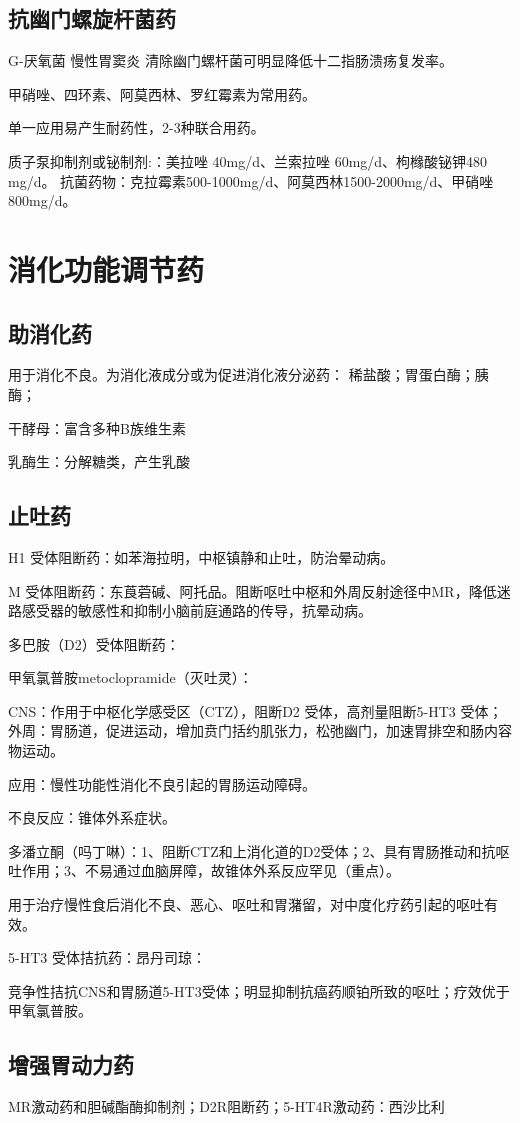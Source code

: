 \documentclass[UTF8]{ctexbook}
\begin{document}
\subsection{抗幽门螺旋杆菌药}
G-厌氧菌   慢性胃窦炎
清除幽门螺杆菌可明显降低十二指肠溃疡复发率。

甲硝唑、四环素、阿莫西林、罗红霉素为常用药。

单一应用易产生耐药性，2-3种联合用药。

质子泵抑制剂或铋制剂:：美拉唑 40mg/d、兰索拉唑 60mg/d、枸橼酸铋钾480 mg/d。
抗菌药物：克拉霉素500-1000mg/d、阿莫西林1500-2000mg/d、甲硝唑 800mg/d。

\section{消化功能调节药}
\subsection{助消化药}
用于消化不良。为消化液成分或为促进消化液分泌药：
稀盐酸；胃蛋白酶；胰酶；

干酵母：富含多种B族维生素

乳酶生：分解糖类，产生乳酸
\subsection{止吐药}
H1 受体阻断药：如苯海拉明，中枢镇静和止吐，防治晕动病。

M 受体阻断药：东莨菪碱、阿托品。阻断呕吐中枢和外周反射途径中MR，降低迷路感受器的敏感性和抑制小脑前庭通路的传导，抗晕动病。

多巴胺（D2）受体阻断药：

甲氧氯普胺metoclopramide（灭吐灵）：

CNS：作用于中枢化学感受区（CTZ），阻断D2 受体，高剂量阻断5-HT3 受体；外周：胃肠道，促进运动，增加贲门括约肌张力，松弛幽门，加速胃排空和肠内容物运动。

应用：慢性功能性消化不良引起的胃肠运动障碍。

不良反应：锥体外系症状。

多潘立酮（吗丁啉）：1、阻断CTZ和上消化道的D2受体；2、具有胃肠推动和抗呕吐作用；3、不易通过血脑屏障，故锥体外系反应罕见（重点）。

用于治疗慢性食后消化不良、恶心、呕吐和胃潴留，对中度化疗药引起的呕吐有效。

5-HT3 受体拮抗药：昂丹司琼：

竞争性拮抗CNS和胃肠道5-HT3受体；明显抑制抗癌药顺铂所致的呕吐；疗效优于甲氧氯普胺。
\subsection{增强胃动力药}
MR激动药和胆碱酯酶抑制剂；D2R阻断药；5-HT4R激动药：西沙比利
\end{document}
